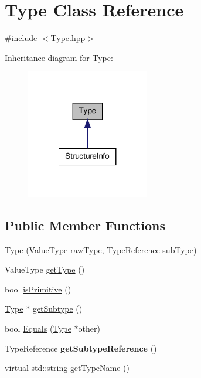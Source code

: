 \hypertarget{class_type}{\section{Type Class Reference}
\label{class_type}
}


{\ttfamily \#include $<$Type.\-hpp$>$}



Inheritance diagram for Type\-:
\nopagebreak
\begin{figure}[H]
\begin{center}
\leavevmode
\includegraphics[width=152pt]{class_type__inherit__graph}
\end{center}
\end{figure}
\subsection*{Public Member Functions}
\begin{DoxyCompactItemize}
\item 
\hyperlink{class_type_aacfda735e873d420c7f73f8fe58d03ea}{Type} (Value\-Type raw\-Type, Type\-Reference sub\-Type)
\item 
Value\-Type \hyperlink{class_type_a07c0c61843a78f19d8a1e0e6ea803941}{get\-Type} ()
\item 
bool \hyperlink{class_type_a8f52724ebcce179fdf4369b023c293b8}{is\-Primitive} ()
\item 
\hyperlink{class_type}{Type} $\ast$ \hyperlink{class_type_af7834b04cf8c033c2f1a8a98d3dff037}{get\-Subtype} ()
\item 
bool \hyperlink{class_type_a72997f74de9e9ec9091e98d5236f2e9c}{Equals} (\hyperlink{class_type}{Type} $\ast$other)
\item 
\hypertarget{class_type_a0d2be6aacb35b00373f35bca59aa36cc}{Type\-Reference {\bfseries get\-Subtype\-Reference} ()}\label{class_type_a0d2be6aacb35b00373f35bca59aa36cc}

\item 
virtual std\-::string \hyperlink{class_type_a7eb8c41756b1c9047f1f02b5ea62aa71}{get\-Type\-Name} ()
\end{DoxyCompactItemize}


